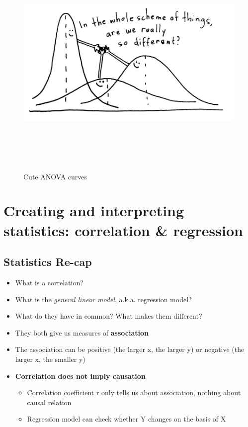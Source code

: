 \documentclass[
]{book}
\providecommand{\tightlist}{%
  \setlength{\itemsep}{0pt}\setlength{\parskip}{0pt}}
\begin{document}
\begin{figure}
\centering
\includegraphics[width=\textwidth,height=4.47917in]{./img/sweet-anova.png}
\caption{Cute ANOVA curves}\label{id}
\end{figure}

\chapter{Creating and interpreting statistics: correlation \& regression}\label{creating-and-interpreting-statistics-correlation-regression}

\section{\texorpdfstring{Statistics Re-cap }{Statistics Re-cap }}\label{statistics-re-cap}

\begin{itemize}
\item
  What is a correlation?
\item
  What is the \emph{general linear model}, a.k.a. regression model?
\item
  What do they have in common? What makes them different?
\item
  They both give us measures of \textbf{association}
\item
  The association can be positive (the larger x, the larger y) or negative (the larger x, the smaller y)
\item
  \textbf{Correlation does not imply causation}

  \begin{itemize}
  \tightlist
  \item
    Correlation coefficient r only tells us about association, nothing about causal relation
  \item
    Regression model can check whether Y changes on the basis of X
  \end{itemize}
\end{itemize}
\end{document}
